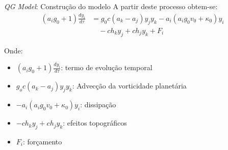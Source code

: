 \begin{frame}{\textit{QG Model}: Construção do modelo}
A partir deste processo obtem-se:
\begin{align}
    (a_ig_0 + 1)\frac{dy_i}{d\tau} &= g_0c(a_k - a_j)y_jy_k - a_i(a_ig_0v_0 + \kappa_0)y_i\nonumber \\ 
    &\quad - ch_ky_j + ch_jy_k + F_i \label{eq:qg-model}
\end{align}

	\begin{small}
		Onde:
			\begin{itemize}
                \item $(a_ig_0 + 1)\frac{dy_i}{d \tau}$: termo de evolução temporal
                \item $g_oc(a_k - a_j)y_jy_k$: Advecção da vorticidade planetária
                \item $-a_i(a_ig_0v_0 + \kappa_0)y_i$: dissipação
			    \item $- ch_ky_j + ch_jy_k$: efeitos topográficos
                \item $F_i$: forçamento
            \end{itemize}
	\end{small}
\end{frame}

